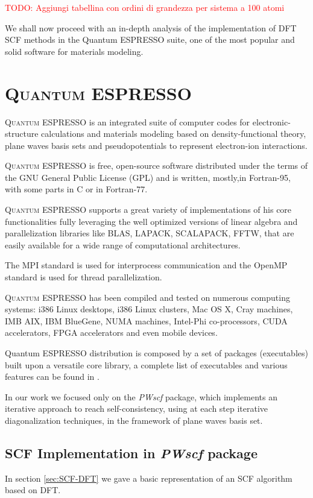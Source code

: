 \documentclass[a4paper,12pt]{article}
\newcommand\mynotes[1]{\begin{flushright}

\textcolor{red}{TODO: #1}\end{flushright}}
\newcommand\QE{\textsc{Quantum} ESPRESSO }
\begin{document}
\mynotes{Aggiungi tabellina con ordini di grandezza per sistema a 100 atomi}
We shall now proceed with an in-depth analysis of the implementation of DFT SCF methods in the Quantum ESPRESSO suite, one of the most popular and solid software for materials modeling.


\newpage

\section{\QE}\label{sec:QE}

\QE  is an integrated suite of computer codes for electronic-structure calculations and materials modeling based on density-functional theory, plane waves basis sets and pseudopotentials to represent electron-ion interactions.

\QE is free, open-source software distributed under the terms of the GNU General Public License (GPL) and is written, mostly,in Fortran-95, with some parts in C or in Fortran-77.

\QE supports a great variety of implementations of his core functionalities fully leveraging the well optimized versions of linear algebra and parallelization libraries like BLAS, LAPACK, SCALAPACK, FFTW, that are easily available for a wide range of computational architectures.

The MPI standard\cite{MPI} is used for interprocess communication and the OpenMP standard\cite{OMP} is used for thread parallelization.


\QE has been compiled and tested on numerous computing systems\cite{QEManual}: i386 Linux desktops, i386 Linux clusters, Mac OS X, Cray machines, IMB AIX, IBM BlueGene, NUMA machines, Intel-Phi co-processors, CUDA accelerators, FPGA accelerators and even mobile devices. 

Quantum ESPRESSO distribution is composed by a set of packages (executables) built upon a versatile core library, a complete list of executables and various features can be found in \cite{QE}.

In our work we focused only on the \textit{PWscf} package, which implements an iterative approach to reach self-consistency, using at each step iterative diagonalization techniques, in the framework of plane waves basis set.


\subsection{SCF Implementation in \textit{PWscf} package}
In section \ref{sec:SCF-DFT} we gave a basic representation of an SCF algorithm based on DFT.
\end{document}
